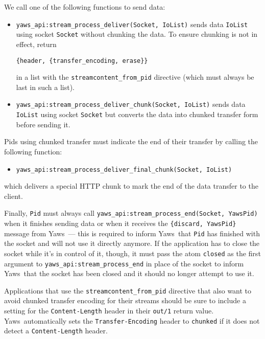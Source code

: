 \documentclass[11pt,oneside,english]{book}
\newcommand{\Yaws}            %
        {{\sc Yaws}}
\begin{document}
We call one of the following functions to send data:
\begin{itemize}
\item \verb+yaws_api:stream_process_deliver(Socket, IoList)+ sends data
  \verb+IoList+ using socket \verb+Socket+ without chunking the data. To
  ensure chunking is not in effect, return

\begin{verbatim}
{header, {transfer_encoding, erase}}
\end{verbatim}

  in a list with the \verb+streamcontent_from_pid+ directive (which must
  always be last in such a list).

\item \verb+yaws_api:stream_process_deliver_chunk(Socket, IoList)+
  sends data \verb+IoList+ using socket \verb+Socket+ but converts
  the data into chunked transfer form before sending it.
\end{itemize}

Pids using chunked transfer must indicate the end of their transfer by
calling the following function:
\begin{itemize}
\item \verb+yaws_api:stream_process_deliver_final_chunk(Socket, IoList)+
\end{itemize}

which delivers a special HTTP chunk to mark the end of the data
transfer to the client.

Finally, \verb+Pid+ must always call
\verb+yaws_api:stream_process_end(Socket, YawsPid)+ when it finishes
sending data or when it receives the \verb+{discard, YawsPid}+ message
from \Yaws\ --- this is required to inform \Yaws\ that \verb+Pid+ has
finished with the socket and will not use it directly anymore. If the
application has to close the socket while it's in control of it,
though, it must pass the atom \verb+closed+ as the first argument to
\verb+yaws_api:stream_process_end+ in place of the socket to inform
\Yaws\ that the socket has been closed and it should no longer attempt
to use it.

App\-li\-ca\-tions that use the \verb+streamcontent_from_pid+
directive that also want to a\-void chunked transfer encoding for
their streams should be sure to include a set\-ting for the
\verb+Content-Length+ header in their \verb+out/1+ return
value. \Yaws\ au\-to\-mat\-i\-cal\-ly sets the
\verb+Transfer-Encoding+ head\-er to \verb+chunked+ if it does not
detect a \verb+Content-Length+ header.
\end{document}
